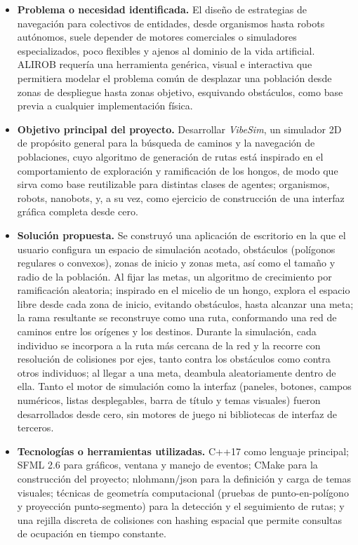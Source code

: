 \documentclass[12pt,a4paper]{article}
\begin{document}
\begin{itemize}
\item \textbf{Problema o necesidad identificada.} El diseño de estrategias de navegación para colectivos de entidades, desde organismos hasta robots autónomos, suele depender de motores comerciales o simuladores especializados, poco flexibles y ajenos al dominio de la vida artificial. ALIROB requería una herramienta genérica, visual e interactiva que permitiera modelar el problema común de desplazar una población desde zonas de despliegue hasta zonas objetivo, esquivando obstáculos, como base previa a cualquier implementación física.

\item \textbf{Objetivo principal del proyecto.} Desarrollar \emph{VibeSim}, un simulador 2D de propósito general para la búsqueda de caminos y la navegación de poblaciones, cuyo algoritmo de generación de rutas está inspirado en el comportamiento de exploración y ramificación de los hongos, de modo que sirva como base reutilizable para distintas clases de agentes; organismos, robots, nanobots, y, a su vez, como ejercicio de construcción de una interfaz gráfica completa desde cero.

\item \textbf{Solución propuesta.} Se construyó una aplicación de escritorio en la que el usuario configura un espacio de simulación acotado, obstáculos (polígonos regulares o convexos), zonas de inicio y zonas meta, así como el tamaño y radio de la población. Al fijar las metas, un algoritmo de crecimiento por ramificación aleatoria; inspirado en el micelio de un hongo, explora el espacio libre desde cada zona de inicio, evitando obstáculos, hasta alcanzar una meta; la rama resultante se reconstruye como una ruta, conformando una red de caminos entre los orígenes y los destinos. Durante la simulación, cada individuo se incorpora a la ruta más cercana de la red y la recorre con resolución de colisiones por ejes, tanto contra los obstáculos como contra otros individuos; al llegar a una meta, deambula aleatoriamente dentro de ella. Tanto el motor de simulación como la interfaz (paneles, botones, campos numéricos, listas desplegables, barra de título y temas visuales) fueron desarrollados desde cero, sin motores de juego ni bibliotecas de interfaz de terceros.

\item \textbf{Tecnologías o herramientas utilizadas.} C++17 como lenguaje principal; SFML 2.6 para gráficos, ventana y manejo de eventos; CMake para la construcción del proyecto; nlohmann/json para la definición y carga de temas visuales; técnicas de geometría computacional (pruebas de punto-en-polígono y proyección punto-segmento) para la detección y el seguimiento de rutas; y una rejilla discreta de colisiones con hashing espacial que permite consultas de ocupación en tiempo constante.


\end{itemize}
\end{document}
